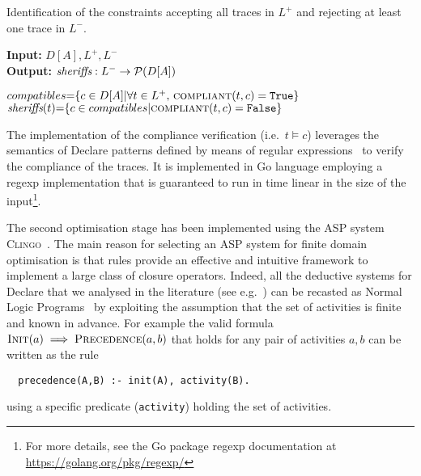 \makeatletter
\algrenewcommand\ALG@beginalgorithmic{\footnotesize}
\makeatother

\begin{algorithm}
    \caption{Identification of the constraints accepting all traces in $L^+$ and rejecting at least one trace in $L^-$.}
    \label{algcand}
    \textbf{Input:}  $D[A], L^+, L^-$\\
    \textbf{Output:} $\textit{sheriffs} : L^- \rightarrow \mathcal{P}({D[A]})$
    	\begin{algorithmic}[1] 
   	\State ${compatibles}{=}\{c \in D[A]| \forall t \in L^+,\, \Call{compliant}{t,c} = \texttt{True}\}$ 
	\label{algcand:candidates}
		\State $\textit{\sheriff}(t){=}\{c \in {compatibles} | \Call{compliant}{t,c} = \texttt{False}\}$\label{algcand:choices}
	\EndFor
	\State \Return \textit{\sheriff}
    \EndProcedure
    \end{algorithmic}
\end{algorithm}

\makeatletter
\algrenewcommand\ALG@beginalgorithmic{\normalsize}
\makeatother

The implementation of the compliance verification  (i.e.\ $t\models c$) leverages the semantics of Declare patterns defined by means of regular expressions \cite{2017-DiCiccio}%
~to verify the compliance of the traces. It is implemented in Go language employing a regexp implementation that is guaranteed to run in time linear in the size of the input\footnote{For more details, see the Go package regexp documentation at \url{https://golang.org/pkg/regexp/}}.
\lstset{language=Prolog}

The second optimisation stage has been implemented using the \ac{ASP} system \textsc{Clingo}~\cite{clingo:2019}. The main reason for selecting an \ac{ASP} system for finite domain optimisation is that rules provide an effective and intuitive framework to implement a large class of closure operators. Indeed, all the deductive systems for Declare that we analysed in the literature (see e.g.~\cite{2016-Bernardi,2017-DiCiccio}) can be recasted as Normal Logic Programs~\cite{2008-Lifschitz} by exploiting the assumption that the set of activities is finite and known in advance.
%
For example the valid formula $\textsc{Init}(a)\implies\textsc{Precedence}(a,b)$ that holds for any pair of activities $a, b$ can be written as the rule
\begin{lstlisting}
  precedence(A,B) :- init(A), activity(B).
\end{lstlisting}
using a specific predicate (\lstinline{activity}) holding the set of activities.


